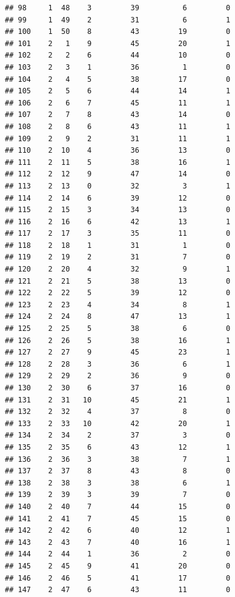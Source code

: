 \documentclass[]{book}
\begin{document}
\begin{verbatim}
## 98     1  48    3         39          6         0
## 99     1  49    2         31          6         1
## 100    1  50    8         43         19         0
## 101    2   1    9         45         20         1
## 102    2   2    6         44         10         0
## 103    2   3    1         36          1         0
## 104    2   4    5         38         17         0
## 105    2   5    6         44         14         1
## 106    2   6    7         45         11         1
## 107    2   7    8         43         14         0
## 108    2   8    6         43         11         1
## 109    2   9    2         31         11         1
## 110    2  10    4         36         13         0
## 111    2  11    5         38         16         1
## 112    2  12    9         47         14         0
## 113    2  13    0         32          3         1
## 114    2  14    6         39         12         0
## 115    2  15    3         34         13         0
## 116    2  16    6         42         13         1
## 117    2  17    3         35         11         0
## 118    2  18    1         31          1         0
## 119    2  19    2         31          7         0
## 120    2  20    4         32          9         1
## 121    2  21    5         38         13         0
## 122    2  22    5         39         12         0
## 123    2  23    4         34          8         1
## 124    2  24    8         47         13         1
## 125    2  25    5         38          6         0
## 126    2  26    5         38         16         1
## 127    2  27    9         45         23         1
## 128    2  28    3         36          6         1
## 129    2  29    2         36          9         0
## 130    2  30    6         37         16         0
## 131    2  31   10         45         21         1
## 132    2  32    4         37          8         0
## 133    2  33   10         42         20         1
## 134    2  34    2         37          3         0
## 135    2  35    6         43         12         1
## 136    2  36    3         38          7         1
## 137    2  37    8         43          8         0
## 138    2  38    3         38          6         1
## 139    2  39    3         39          7         0
## 140    2  40    7         44         15         0
## 141    2  41    7         45         15         0
## 142    2  42    6         40         12         1
## 143    2  43    7         40         16         1
## 144    2  44    1         36          2         0
## 145    2  45    9         41         20         0
## 146    2  46    5         41         17         0
## 147    2  47    6         43         11         0

\end{verbatim}
\end{document}
